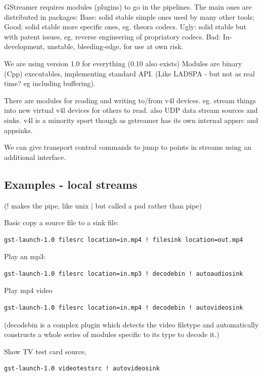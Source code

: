 \documentclass[oneside,english]{scrbook}
\begin{document}
GStreamer requires modules (plugins) to go in the pipelines. The main ones are distributed in packages:
 Base: solid stable simple ones used by many other tools;
 Good: solid stable more specific ones, eg. theora codecs.
 Ugly: solid stable but with patent issues, eg. reverse engineering of propriatory codecs.
 Bad: In-development, unstable, bleeding-edge, for use at own risk.

We are using version 1.0 for everything (0.10 also exists) Modules
are binary (Cpp) executables, implementing standard API. (Like LADSPA
- but not as real time? eg including buffering).

There are modules for reading and writing to/from v4l devices. eg. stream things
into new virtual v4l devices for others to read. also UDP data stream
sources and sinks. v4l is a minority sport though as gstreamer has
its own internal appsrc and appsinks.

We can give transport control commands to jump to points in streams using an additional interface.

\subsection{Examples - local streams}

(\textquotedbl{}!\textquotedbl{} makes the pipe, like unix \textquotedbl{}|\textquotedbl{}
but called a \textquotedbl{}pad\textquotedbl{} rather than \textquotedbl{}pipe\textquotedbl{})

Basic copy a source file to a sink file: 

\begin{lstlisting}
gst-launch-1.0 filesrc location=in.mp4 ! filesink location=out.mp4
\end{lstlisting}

Play an mp3:

\begin{lstlisting}
gst-launch-1.0 filesrc location=in.mp3 ! decodebin ! autoaudiosink
\end{lstlisting}

Play mp4 video 
\begin{lstlisting}
gst-launch-1.0 filesrc location=in.mp4 ! decodebin ! autovideosink
\end{lstlisting}
(decodebin is a complex plugin which detects the video filetype and automatically constructs a whole series of modules specific to its type to decode it.)

Show TV test card source,
\begin{lstlisting}
gst-launch-1.0 videotestsrc ! autovideosink
\end{lstlisting}
\end{document}

